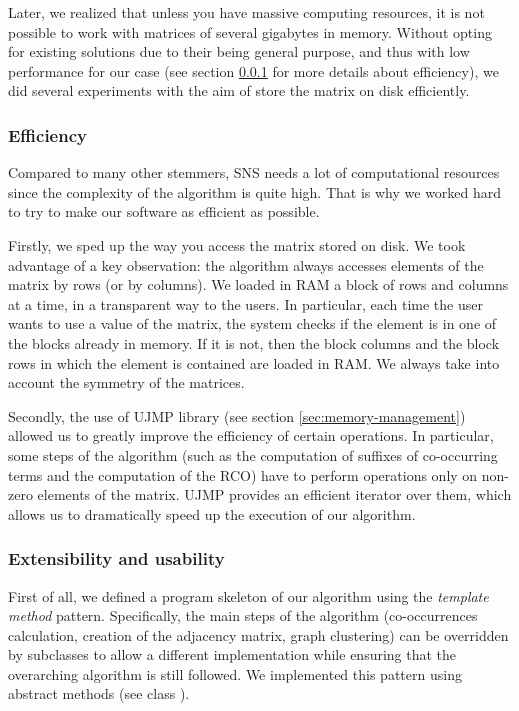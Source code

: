             Later, we realized that unless you have massive computing resources, it is not possible to work with matrices of several gigabytes in memory. Without opting for existing solutions due to their being general purpose, and thus with low performance for our case (see section \ref{sec:efficiency} for more details about efficiency), we did several experiments with the aim of store the matrix on disk efficiently.

        \subsubsection{Efficiency}\label{sec:efficiency}

            Compared to many other stemmers, SNS needs a lot of computational resources since the complexity of the algorithm is quite high. That is why we worked hard to try to make our software as efficient as possible.
            
            Firstly, we sped up the way you access the matrix stored on disk. We took advantage of a key observation: the algorithm always accesses elements of the matrix by rows (or by columns). We loaded in RAM a block of rows and columns at a time, in a transparent way to the users. In particular, each time the user wants to use a value of the matrix, the system checks if the element is in one of the blocks already in memory. If it is not, then the block columns and the block rows in which the element is contained are loaded in RAM. We always take into account the symmetry of the matrices.

            Secondly, the use of UJMP library (see section \ref{sec:memory-management}) allowed us to greatly improve the efficiency of certain operations. In particular, some steps of the algorithm (such as the computation of suffixes of co-occurring terms and the computation of the RCO) have to perform operations only on non-zero elements of the matrix. UJMP provides an efficient iterator over them, which allows us to dramatically speed up the execution of our algorithm.

        \subsubsection{Extensibility and usability}
            First of all, we defined a program skeleton of our algorithm using the \emph{template method} pattern. Specifically, the main steps of the algorithm (co-occurrences calculation, creation of the adjacency matrix, graph clustering) can be overridden by subclasses to allow a different implementation while ensuring that the overarching algorithm is still followed. We implemented this pattern using abstract methods (see class ).

